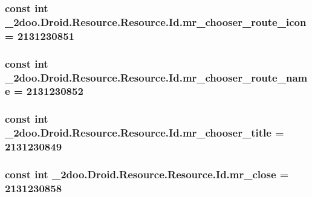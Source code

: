 \hypertarget{class__2doo_1_1_droid_1_1_resource_1_1_id_6adccce6feee1e62e04c2011050def5b}{
\subsubsection[{mr\_\-chooser\_\-route\_\-icon}]{\setlength{\rightskip}{0pt plus 5cm}const int \_\-2doo.Droid.Resource.Resource.Id.mr\_\-chooser\_\-route\_\-icon = 2131230851}}
\label{class__2doo_1_1_droid_1_1_resource_1_1_id_6adccce6feee1e62e04c2011050def5b}


\hypertarget{class__2doo_1_1_droid_1_1_resource_1_1_id_38fd5d323794ec90b25c7827a15a1ebd}{
\subsubsection[{mr\_\-chooser\_\-route\_\-name}]{\setlength{\rightskip}{0pt plus 5cm}const int \_\-2doo.Droid.Resource.Resource.Id.mr\_\-chooser\_\-route\_\-name = 2131230852}}
\label{class__2doo_1_1_droid_1_1_resource_1_1_id_38fd5d323794ec90b25c7827a15a1ebd}


\hypertarget{class__2doo_1_1_droid_1_1_resource_1_1_id_c1d8de3697aa046a2684746774ae00c4}{
\subsubsection[{mr\_\-chooser\_\-title}]{\setlength{\rightskip}{0pt plus 5cm}const int \_\-2doo.Droid.Resource.Resource.Id.mr\_\-chooser\_\-title = 2131230849}}
\label{class__2doo_1_1_droid_1_1_resource_1_1_id_c1d8de3697aa046a2684746774ae00c4}


\hypertarget{class__2doo_1_1_droid_1_1_resource_1_1_id_384ead69f0212f25ca41c5ae5d545a7b}{
\subsubsection[{mr\_\-close}]{\setlength{\rightskip}{0pt plus 5cm}const int \_\-2doo.Droid.Resource.Resource.Id.mr\_\-close = 2131230858}}
\label{class__2doo_1_1_droid_1_1_resource_1_1_id_384ead69f0212f25ca41c5ae5d545a7b}



